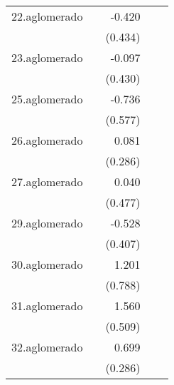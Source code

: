{\begin{longtable}{l*{4}{D{.}{.}{-1}}}
\addlinespace
22.aglomerado&                     &      -0.420         &                     &                     \\
            &                     &     (0.434)         &                     &                     \\
\addlinespace
23.aglomerado&                     &      -0.097         &                     &                     \\
            &                     &     (0.430)         &                     &                     \\
\addlinespace
25.aglomerado&                     &      -0.736         &                     &                     \\
            &                     &     (0.577)         &                     &                     \\
\addlinespace
26.aglomerado&                     &       0.081         &                     &                     \\
            &                     &     (0.286)         &                     &                     \\
\addlinespace
27.aglomerado&                     &       0.040         &                     &                     \\
            &                     &     (0.477)         &                     &                     \\
\addlinespace
29.aglomerado&                     &      -0.528         &                     &                     \\
            &                     &     (0.407)         &                     &                     \\
\addlinespace
30.aglomerado&                     &       1.201         &                     &                     \\
            &                     &     (0.788)         &                     &                     \\
\addlinespace
31.aglomerado&                     &       1.560\sym{**} &                     &                     \\
            &                     &     (0.509)         &                     &                     \\
\addlinespace
32.aglomerado&                     &       0.699\sym{*}  &                     &                     \\
            &                     &     (0.286)         &                     &                     \\

\end{longtable}}
